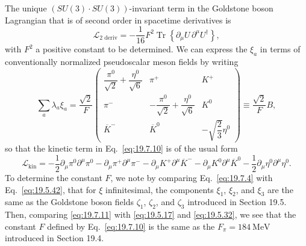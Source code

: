 The unique $(SU(3)\cdot SU(3))$-invariant term in the Goldstone boson Lagrangian that is of second order in spacetime derivatives is
\begin{equation}
\mathcal L_{\text{2 deriv}}
=-\frac{1}{16}F^2\operatorname{Tr}
\left\{\partial_\mu U\,\partial^\mu U^\dagger\right\},
\tag{19.7.10}\label{eq:19.7.10}
\end{equation}
with $F^2$ a positive constant to be determined. We can express the $\xi_a$ in terms of conventionally normalized pseudoscalar meson fields by writing
\begin{equation}
\sum_a\lambda_a\xi_a
=\frac{\sqrt2}{F}
\begin{pmatrix}
\dfrac{\pi^0}{\sqrt2}+\dfrac{\eta^0}{\sqrt6}&\pi^+&K^+\\[5pt]
\pi^-&-\dfrac{\pi^0}{\sqrt2}+\dfrac{\eta^0}{\sqrt6}&K^0\\[5pt]
\overline K^-&\overline K^0&-\sqrt{\dfrac23}\eta^0
\end{pmatrix}
\equiv\frac{\sqrt2}{F}B,
\tag{19.7.11}\label{eq:19.7.11}
\end{equation}
so that the kinetic term in Eq.~\eqref{eq:19.7.10} is of the usual form
\[
\mathcal L_{\text{kin}}
=-\frac12\partial_\mu\pi^0\partial^\mu\pi^0
-\partial_\mu\pi^+\partial^\mu\pi^-
-\partial_\mu K^+\partial^\mu\overline K^-
-\partial_\mu K^0\partial^\mu\overline K^0
-\frac12\partial_\mu\eta^0\partial^\mu\eta^0.
\]
To determine the constant $F$, we note by comparing Eq.~\eqref{eq:19.7.4} with Eq.~\eqref{eq:19.5.42}, that for $\xi$ infinitesimal, the components $\xi_1$, $\xi_2$, and $\xi_3$ are the same as the Goldstone boson fields $\zeta_1$, $\zeta_2$, and $\zeta_3$ introduced in Section 19.5. Then, comparing \eqref{eq:19.7.11} with \eqref{eq:19.5.17} and \eqref{eq:19.5.32}, we see that the constant $F$ defined by Eq.~\eqref{eq:19.7.10} is the same as the $F_\pi=184\ \mathrm{MeV}$ introduced in Section 19.4.

